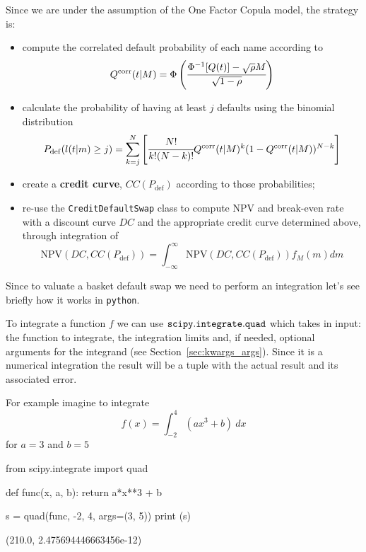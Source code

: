 Since we are under the assumption of the One Factor Copula model, the strategy is:
\begin{itemize}
\item compute the correlated default probability of each name according to 
\begin{equation}
Q^{\textrm{corr}}(t|M) = \Phi\left(\cfrac{\Phi^{-1}[Q(t)]-\sqrt{\rho} M}{\sqrt{1-\rho}}\right)
\end{equation}
\item calculate the probability of having at least $j$ defaults using the binomial distribution
\begin{equation}
P_{\mathrm{def}}(l(t|m) \ge j) = \sum_{k=j}^{N}\left[  \cfrac{N!}{k!(N-k)!}Q^{\textrm{corr}}(t|M)^k(1-Q^{\textrm{corr}}(t|M))^{N-k}\right]
\end{equation}
\item create a \textbf{credit curve}, $CC(P_{\mathrm{def}})$ according to those probabilities;
\item re-use the \texttt{CreditDefaultSwap} class to compute NPV and break-even rate with a discount curve $DC$ and the appropriate credit curve determined above, through integration of
\begin{equation}
\mathrm{NPV}(DC, CC(P_{\mathrm{def}})) = \int_{-\infty}^{\infty}{\mathrm{NPV}(DC, CC(P_{\mathrm{def}})) f_M(m)dm} 
\end{equation}
\end{itemize}

Since to valuate a basket default swap we need to perform an integration let's see briefly how it works in \texttt{python}.

To integrate a function $f$ we can use \(\tt{scipy.integrate.quad}\) which takes in input: the function to integrate, the integration limits and, if needed, optional arguments for the integrand (see Section~\ref{sec:kwargs_args}). Since it is a numerical integration the result will be a tuple with the actual result and its associated error.

For example imagine to integrate
\[f(x) = \int_{-2}^{4}(ax^{3} + b)~dx\]
for \(a=3\) and \(b=5\)

\begin{ipython}
from scipy.integrate import quad

def func(x, a, b):
    return a*x**3 + b

s = quad(func, -2, 4, args=(3, 5))
print (s)
\end{ipython}
\begin{ioutput}
(210.0, 2.475694446663456e-12)
\end{ioutput}

